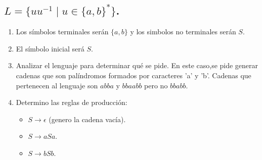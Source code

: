 \documentclass{article}
\begin{document}
        \subsection{$L = \{uu^{-1} \mid u \in \{a, b\}^*\}$.}
        \begin{flushleft}
            \begin{enumerate}
                \item Los símbolos terminales serán $\{a,b\}$ y los simbolos no terminales serán $S$.
                \item El símbolo inicial será $S$.
                \item Analizar el lenguaje para determinar qué se pide. En este caso,se pide generar 
                cadenas que son palíndromos formados por caracteres 'a' y 'b'. Cadenas que pertenecen al lenguaje son $abba$ y $bbaabb$ pero no $bbabb$. 
                \item Determino las reglas de producción:
                \begin{itemize}
                    \item $S \rightarrow \epsilon$ (genero la cadena vacía).
                    \item $S \rightarrow aSa$.
                    \item $S \rightarrow bSb$.
                \end{itemize}


\end{enumerate}
\end{flushleft}
\end{document}
